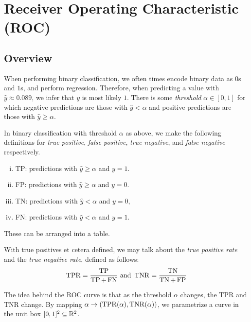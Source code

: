 \section{Receiver Operating Characteristic (ROC)}
\label{sec:AUC-ROC}

\subsection{Overview}

When performing binary classification, we often times encode binary data as $0$s and $1$s, and perform regression. Therefore, when predicting a value with $\hat y \approx 0.089$, we infer that $y$ is most likely $1$. There is some \emph{threshold} $\alpha \in [0,1]$ for which negative predictions are those with $\hat y < \alpha$ and positive predictions are those with $\hat y \geq \alpha$.

\begin{definition}
  In binary classification with threshold $\alpha$ as above, we make the following definitions for \emph{true positive}, \emph{false positive}, \emph{true negative}, and \emph{false negative} respectively.
  \begin{enumerate}[(i)]
    \item TP: predictions with $\hat y \geq \alpha$ and $y = 1$.
    \item FP: predictions with $\hat y \geq \alpha$ and $y = 0$.
    \item TN: predictions with $\hat y < \alpha$ and $y = 0$,
    \item FN: predictions with $\hat y < \alpha$ and $y = 1$.
  \end{enumerate}
  These can be arranged into a table.
  \begin{figure}[H]
  \end{figure}
\end{definition}


With true positives et cetera defined, we may talk about the \emph{true positive rate} and the \emph{true negative rate}, defined as follows:
\begin{equation}
  \operatorname{TPR} = \frac{\operatorname{TP}}{\operatorname{TP} + \operatorname{FN}}
  \text{ and } 
  \operatorname{TNR} = \frac{\operatorname{TN}}{\operatorname{TN} + \operatorname{FP}}
\end{equation}

The idea behind the ROC curve is that as the threshold $\alpha$ changes, the TPR and TNR change. By mapping $\alpha \to (\operatorname{TPR}(\alpha), \operatorname{TNR}(\alpha))$, we parametrize a curve in the unit box $[0,1]^2 \subseteq \mathbb{R}^2$.

